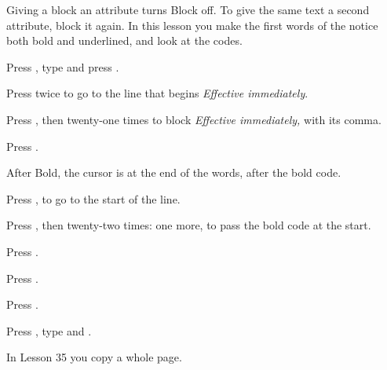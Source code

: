 Giving a block an attribute turns Block off.  To give the same text a second
attribute, block it again.  In this lesson you make the first words of the
notice both bold and underlined, and look at the codes.

\begin{WPSteps}
\item Press , type  and press
.
\item Press  twice to go to the line that begins
\textit{Effective immediately}.
\item Press , then  twenty-one
times
to block \textit{Effective immediately,} with its comma.
\item Press .
\end{WPSteps}

After Bold, the cursor is at the end of the words, after the bold code.
\begin{WPSteps}
\item Press ,  to go to the start of the line.
\item Press , then  twenty-two times:
one more, to pass the bold code at the start.
\item Press .
\item Press .
\end{WPSteps}

\begin{WPSteps}
\item Press .
\item Press , type  and .
\end{WPSteps}
\EndReplay
In Lesson 35 you copy a whole page.
